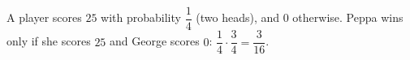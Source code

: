 A player scores $25$ with probability $\dfrac14$ (two heads), and $0$ otherwise. Peppa wins only if she scores $25$ and George scores $0$: $\dfrac14\cdot\dfrac34=\boxed{\dfrac3{16}}$.
